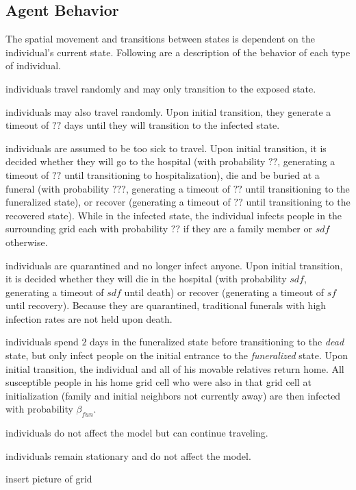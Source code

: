\subsection{Agent Behavior}
The spatial movement and transitions between states is dependent on the individual's current state. Following are a description of the behavior of each type of individual.
\begin{description}[labelsep=1.5mm]
\setlength\itemsep{-3mm}
\item[Susceptible] individuals travel randomly and may only transition to the exposed state.\\
\item[Exposed] individuals may also travel randomly. Upon initial transition, they generate a timeout of $??$ days until they will transition to the infected state.\\
\item[Infected] individuals are assumed to be too sick to travel. Upon initial transition, it is decided whether they will go to the hospital (with probability $??$, generating a timeout of $??$ until transitioning to hospitalization), die and be buried at a funeral (with probability $???$, generating a timeout of $??$ until transitioning to the funeralized state), or recover (generating a timeout of $??$ until transitioning to the recovered state). While in the infected state, the individual infects people in the surrounding grid each with probability $??$ if they are a family member or $sdf$ otherwise.\\
\item[Hospitalized] individuals are quarantined and no longer infect anyone. Upon initial transition, it is decided whether they will die in the hospital (with probability $sdf$, generating a timeout of $sdf$ until death) or recover (generating a timeout of $sf$ until recovery). Because they are quarantined, traditional funerals with high infection rates are not held upon death.\\
\item[Funeralized] individuals spend $2$ days in the funeralized state before transitioning to the \emph{dead} state, but only infect people on the initial entrance to the \emph{funeralized} state. Upon initial transition, the individual and all of his movable relatives return home. All susceptible people in his home grid cell who were also in that grid cell at initialization (family and initial neighbors not currently away) are then infected with probability $\beta_{fun}$.\\
\item[Recovered] individuals do not affect the model but can continue traveling.\\
\item[Dead] individuals remain stationary and do not affect the model.\\
\end{description}
insert picture of grid

